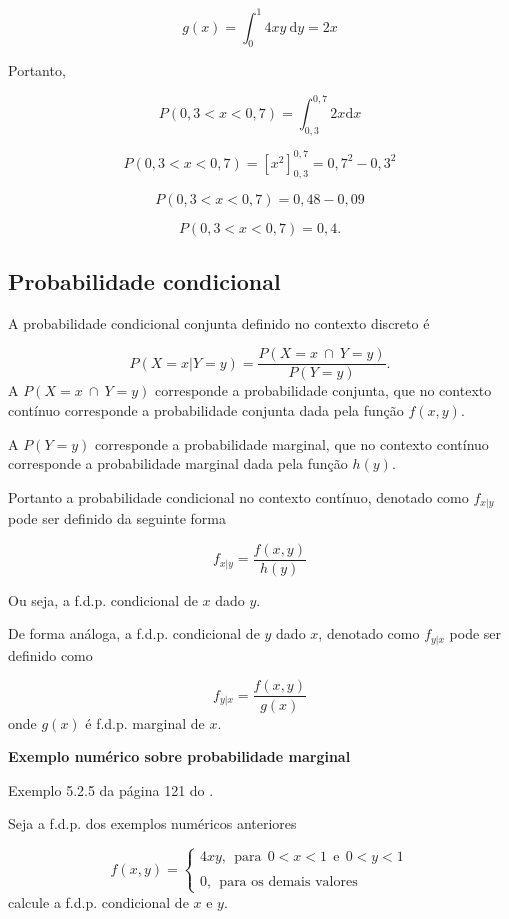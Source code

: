 \documentclass[
]{book}
\begin{document}
\[
  g(x) = \int_{0}^{1} 4xy~ \text{d}y = 2x
\]

Portanto,

\[
  P(0,3 < x < 0,7) = \int_{0,3}^{0,7}2x \text{d}x
\]

\[
  P(0,3 < x < 0,7) = \left[ x^2 \right]_{0,3}^{0,7} = 0,7^2 - 0,3^2
\]

\[
  P(0,3 < x < 0,7) = 0,48 - 0,09
\]

\[
  P(0,3 < x < 0,7) = 0,4.
\]

\hypertarget{probabilidade-condicional}{%
\subsection{Probabilidade condicional}\label{probabilidade-condicional}}

A probabilidade condicional conjunta definido no contexto discreto é

\[
  P(X=x|Y=y) = \dfrac{P (X=x~\cap~Y=y)}{P(Y=y)}.
\]
A \(P(X=x~\cap~Y=y)\) corresponde a probabilidade conjunta, que no contexto contínuo corresponde a probabilidade conjunta dada pela função \(f(x,y)\).

A \(P(Y=y)\) corresponde a probabilidade marginal, que no contexto contínuo corresponde a probabilidade marginal dada pela função \(h(y)\).

Portanto a probabilidade condicional no contexto contínuo, denotado como \(f_{x|y}\) pode ser definido da seguinte forma

\[
  f_{x|y} = \dfrac{f(x,y)}{h(y)}
\]

Ou seja, a f.d.p. condicional de \(x\) dado \(y\).

De forma análoga, a f.d.p. condicional de \(y\) dado \(x\), denotado como \(f_{y|x}\) pode ser definido como

\[
  f_{y|x} = \dfrac{f(x,y)}{g(x)}
\]
onde \(g(x)\) é f.d.p. marginal de \(x\).

\textbf{Exemplo numérico sobre probabilidade marginal}

Exemplo 5.2.5 da página 121 do \citet{Sartoris2013}.

Seja a f.d.p. dos exemplos numéricos anteriores

\begin{equation}
  f(x,y) = 
    \begin{cases}
      4xy,~~\text{para}~~0 < x < 1~~\text{e}~~0 < y < 1 \\
      \\
      0, ~~\text{para os demais valores}
    \end{cases}
\end{equation}
calcule a f.d.p. condicional de \(x\) e \(y\).
\end{document}
